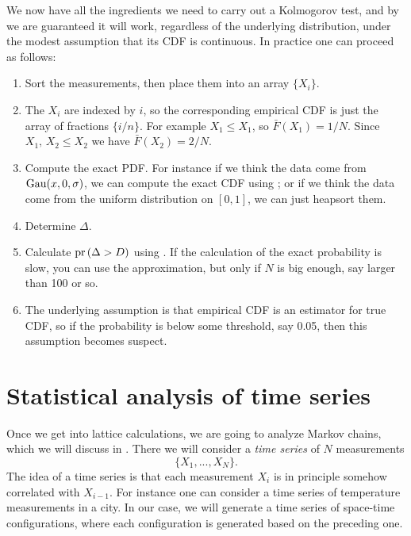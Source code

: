 We now have all the ingredients we need to carry out a Kolmogorov test,
and by  we are guaranteed it will work, regardless
of the underlying distribution, under the modest assumption that its
CDF is continuous. In practice one can proceed as follows:
\begin{enumerate}
  \item Sort the measurements, then place them into an array $\{X_i\}$.
  \item The $X_i$ are indexed by $i$, so the corresponding empirical CDF 
        is just the array of fractions $\{i/n\}$. For example $X_1\leq X_1$, 
        so $\bar{F}(X_1)=1/N$. Since $X_1,\,X_2\leq X_2$ we have 
        $\bar{F}(X_2)=2/N$.
  \item Compute the exact PDF. For instance if we think the
        data come from $\operatorname{Gau}(x,0,\sigma)$, we can compute the exact CDF
        using ; or if we think the data come from the 
        uniform distribution on $[0,1]$, we can just heapsort them.
  \item Determine $\Delta$.
  \item Calculate $\operatorname{pr}\left(\Delta>D\right)$ using .
        If the calculation of the exact probability is slow, you can
        use the approximation, but only if $N$ is big enough, say larger
        than 100 or so.
  \item The underlying assumption is that empirical CDF is an estimator
        for true CDF, so if the probability is below some threshold,
        say 0.05, then this assumption becomes suspect. 
\end{enumerate}

\section{Statistical analysis of time series}

Once we get into lattice calculations, we are going to analyze
Markov chains, which we will discuss in . There
we will consider a {\it time series} of $N$
measurements
\begin{equation}
\{X_1, ..., X_N\}. 
\end{equation}
The idea of a time series is that each measurement
$X_i$ is in principle somehow correlated with $X_{i-1}$.
For instance one can consider a time series of temperature
measurements in a city. In our case, we will generate a time
series of space-time configurations, where each configuration
is generated based on the preceding one.

